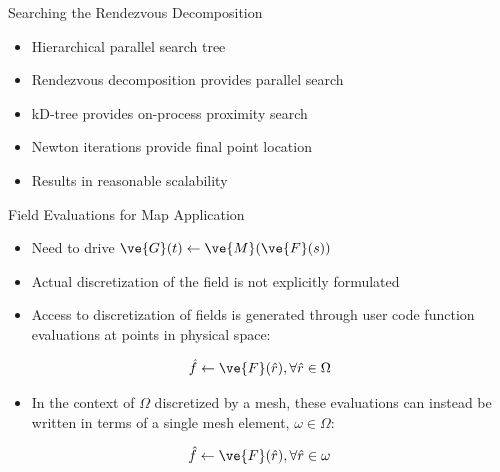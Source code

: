 \documentclass{beamer}
\begin{document}
\begin{frame}{Searching the Rendezvous Decomposition}
  
  \begin{itemize}
  \item Hierarchical parallel search tree
    \bigskip
  \item Rendezvous decomposition provides parallel search
    \bigskip
  \item kD-tree provides on-process proximity search
    \bigskip
  \item Newton iterations provide final point location
    \bigskip
  \item Results in reasonable scalability
  \end{itemize}

\end{frame}

\begin{frame}{Field Evaluations for Map Application}

  \begin{itemize}
  \item Need to drive $\ve{G}(t)\leftarrow \ve{M}(\ve{F}(s))$
    \medskip
  \item Actual discretization of the field is not explicitly
    formulated
    \medskip
  \item Access to discretization of fields is generated through user
    code function evaluations at points in physical space:
    \medskip
  \end{itemize}

  \[
  \hat{f} \leftarrow \ve{F}(\hat{r}), \forall \hat{r} \in \Omega
  \]

  \begin{itemize}
  \item In the context of $\Omega$ discretized by a mesh, these
    evaluations can instead be written in terms of a single mesh
    element, $\omega \in \Omega$:
  \end{itemize}

  \[
  \hat{f} \leftarrow \ve{F}(\hat{r}), \forall \hat{r} \in \omega
  \]

\end{frame}
\end{document}
